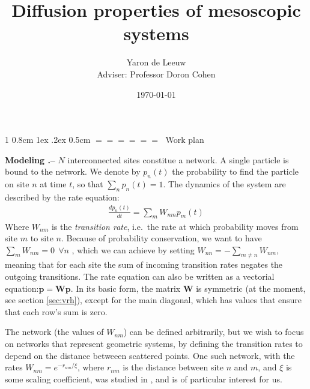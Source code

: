 \documentclass[onecolumn,fleqn,notitlepage,secnumarabic]{revtex4}
\makeatletter
\def\section{%
  \@startsection
    {section}%
    {1}%
    {\z@}%
    {0.8cm \@plus1ex \@minus .2ex}%
    {0.5cm}%
    {\Large\bf $=\!=\!=\!=\!=\!=\;$}%
}%
\makeatother
\begin{document}
\title{Diffusion properties of mesoscopic systems}

\author{Yaron de Leeuw \\ Adviser: Professor Doron Cohen}
\date{\today}
\maketitle


\section{Work plan}


{ \bf Modeling .-- } $N$ interconnected sites constitue a network. A single particle is bound to the network. We denote by $p_n(t)$ the probability to find the particle on site $n$ at time $t$, so that $\sum_n p_n(t) =1$. The dynamics of the system are described by the rate equation:
\begin{align}
\frac{dp_n(t)}{dt} = \sum_m W_{nm}p_m(t)
\end{align}
Where $W_{nm}$ is the \emph{transition rate}, i.e.\ the rate at which probability moves from site $m$ to site $n$.
Because of probability conservation, we want to have $\sum_m W_{nm} = 0 \ \ \forall n$ , which we can achieve by setting $W_{nn} = -\sum_{m\ne n} W_{nm} $, meaning that for each site the sum of incoming transition rates negates the outgoing transitions.
The rate equation can also be written as a vectorial equation:$\boldsymbol{ \dot p } = \boldsymbol{W} \boldsymbol{p}$. In its basic form, the matrix $\boldsymbol{W}$ is symmetric (at the moment, see section \ref{sec:vrh}), except for the main diagonal, which has values that ensure that each row's sum is zero.

The network (the values of $W_{nm}$) can be defined arbitrarily, but we wish to focus on networks that represent geometric systems, by defining the transition rates to depend on the distance betweeen scattered points. One such network, with the rates $W_{nm}= e^{-r_{nm}/ \xi}$, where $r_{nm}$ is the distance between site $n$ and $m$, and $\xi$ is some scaling coefficient, was studied in \cite{Amir:2010:PRL}, and is of particular interest for us.
\end{document}
